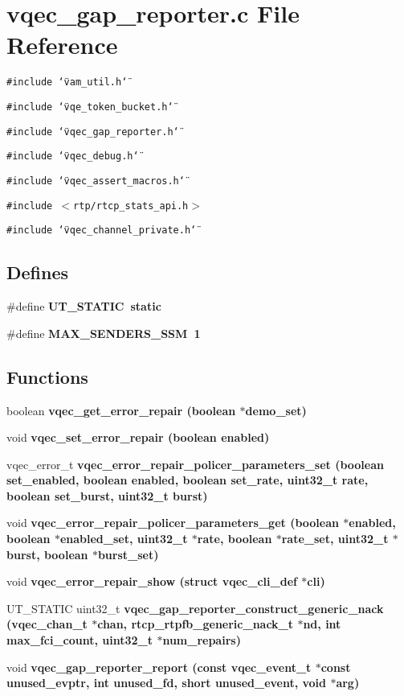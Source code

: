 \section{vqec\_\-gap\_\-reporter.c File Reference}
\label{vqec__gap__reporter_8c}
{\tt \#include \char`\"{}vam\_\-util.h\char`\"{}}\par
{\tt \#include \char`\"{}vqe\_\-token\_\-bucket.h\char`\"{}}\par
{\tt \#include \char`\"{}vqec\_\-gap\_\-reporter.h\char`\"{}}\par
{\tt \#include \char`\"{}vqec\_\-debug.h\char`\"{}}\par
{\tt \#include \char`\"{}vqec\_\-assert\_\-macros.h\char`\"{}}\par
{\tt \#include $<$rtp/rtcp\_\-stats\_\-api.h$>$}\par
{\tt \#include \char`\"{}vqec\_\-channel\_\-private.h\char`\"{}}\par
\subsection*{Defines}
\begin{CompactItemize}
\item 
\#define \bf{UT\_\-STATIC}~static
\item 
\#define \bf{MAX\_\-SENDERS\_\-SSM}~1
\end{CompactItemize}
\subsection*{Functions}
\begin{CompactItemize}
\item 
boolean \bf{vqec\_\-get\_\-error\_\-repair} (boolean $\ast$demo\_\-set)
\item 
void \bf{vqec\_\-set\_\-error\_\-repair} (boolean enabled)
\item 
vqec\_\-error\_\-t \bf{vqec\_\-error\_\-repair\_\-policer\_\-parameters\_\-set} (boolean set\_\-enabled, boolean enabled, boolean set\_\-rate, uint32\_\-t rate, boolean set\_\-burst, uint32\_\-t burst)
\item 
void \bf{vqec\_\-error\_\-repair\_\-policer\_\-parameters\_\-get} (boolean $\ast$enabled, boolean $\ast$enabled\_\-set, uint32\_\-t $\ast$rate, boolean $\ast$rate\_\-set, uint32\_\-t $\ast$burst, boolean $\ast$burst\_\-set)
\item 
void \bf{vqec\_\-error\_\-repair\_\-show} (struct \bf{vqec\_\-cli\_\-def} $\ast$cli)
\item 
UT\_\-STATIC uint32\_\-t \bf{vqec\_\-gap\_\-reporter\_\-construct\_\-generic\_\-nack} (\bf{vqec\_\-chan\_\-t} $\ast$chan, rtcp\_\-rtpfb\_\-generic\_\-nack\_\-t $\ast$nd, int max\_\-fci\_\-count, uint32\_\-t $\ast$num\_\-repairs)
\item 
void \bf{vqec\_\-gap\_\-reporter\_\-report} (const vqec\_\-event\_\-t $\ast$const unused\_\-evptr, int unused\_\-fd, short unused\_\-event, void $\ast$arg)
\end{CompactItemize}
